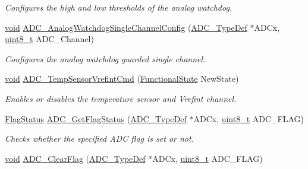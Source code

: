\begin{DoxyCompactItemize}
\begin{DoxyCompactList}\small\item\em Configures the high and low thresholds of the analog watchdog. \end{DoxyCompactList}\item 
\hyperlink{usb__devapi_8h_afabf60e7f57651d6d595a02c75f07cd0}{void} \hyperlink{group___a_d_c___private___functions_ga03cef3d12292ffa2b8520524d5b0226c}{A\+D\+C\+\_\+\+Analog\+Watchdog\+Single\+Channel\+Config} (\hyperlink{struct_a_d_c___type_def}{A\+D\+C\+\_\+\+Type\+Def} $\ast$A\+D\+Cx, \hyperlink{_p_e___types_8h_aba7bc1797add20fe3efdf37ced1182c5}{uint8\+\_\+t} A\+D\+C\+\_\+\+Channel)
\begin{DoxyCompactList}\small\item\em Configures the analog watchdog guarded single channel. \end{DoxyCompactList}\item 
\hyperlink{usb__devapi_8h_afabf60e7f57651d6d595a02c75f07cd0}{void} \hyperlink{group___a_d_c___private___functions_ga848682e2d7d3de9f8cf03ffa4c11f0b5}{A\+D\+C\+\_\+\+Temp\+Sensor\+Vrefint\+Cmd} (\hyperlink{agilefox_2library_2inc_2stm32f10x__type_8h_ac9a7e9a35d2513ec15c3b537aaa4fba1}{Functional\+State} New\+State)
\begin{DoxyCompactList}\small\item\em Enables or disables the temperature sensor and Vrefint channel. \end{DoxyCompactList}\item 
\hyperlink{agilefox_2library_2inc_2stm32f10x__type_8h_a89136caac2e14c55151f527ac02daaff}{Flag\+Status} \hyperlink{group___a_d_c___private___functions_gaa12546e51ec905c90a3aada432bd4633}{A\+D\+C\+\_\+\+Get\+Flag\+Status} (\hyperlink{struct_a_d_c___type_def}{A\+D\+C\+\_\+\+Type\+Def} $\ast$A\+D\+Cx, \hyperlink{_p_e___types_8h_aba7bc1797add20fe3efdf37ced1182c5}{uint8\+\_\+t} A\+D\+C\+\_\+\+F\+L\+AG)
\begin{DoxyCompactList}\small\item\em Checks whether the specified A\+DC flag is set or not. \end{DoxyCompactList}\item 
\hyperlink{usb__devapi_8h_afabf60e7f57651d6d595a02c75f07cd0}{void} \hyperlink{group___a_d_c___private___functions_gaf34f36798f811b4a41321ea2d12118d4}{A\+D\+C\+\_\+\+Clear\+Flag} (\hyperlink{struct_a_d_c___type_def}{A\+D\+C\+\_\+\+Type\+Def} $\ast$A\+D\+Cx, \hyperlink{_p_e___types_8h_aba7bc1797add20fe3efdf37ced1182c5}{uint8\+\_\+t} A\+D\+C\+\_\+\+F\+L\+AG)

\end{DoxyCompactItemize}
